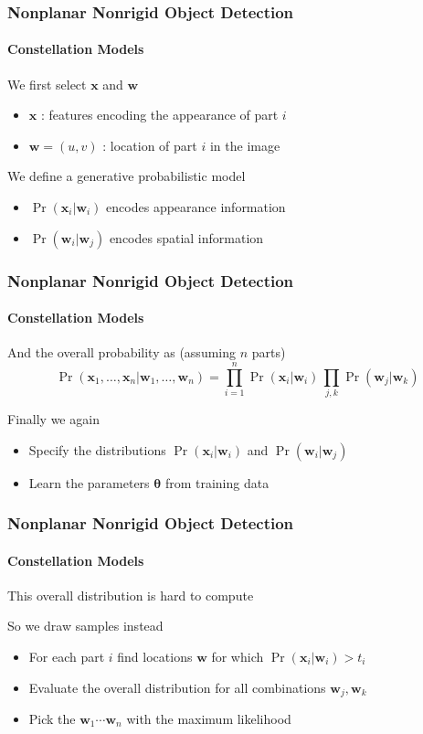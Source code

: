 \documentclass[xetex,professionalfont]{beamer}
\renewcommand{\vec}[1]{\ensuremath{\mathbf{#1}}}
\newcommand{\vw}{\vec{w}}
\newcommand{\vx}{\vec{x}}
\newcommand{\bth}{\boldsymbol{\theta}}
\begin{document}

\begin{frame}
\frametitle{Nonplanar Nonrigid Object Detection}
\framesubtitle{Constellation Models}

We first select $\vx$ and $\vw$
\begin{itemize}
    \item $\vx$ : features encoding the appearance of part $i$ %
    \item $\vw=(u,v)$ : location of part $i$ in the image
\end{itemize}

\bigskip
We define a generative probabilistic model
\begin{itemize}
    \item $\Pr(\vx_i|\vw_i)$ encodes appearance information
    \item $\Pr(\vw_i|\vw_j)$ encodes spatial information
\end{itemize}


\end{frame}


\begin{frame}
\frametitle{Nonplanar Nonrigid Object Detection}
\framesubtitle{Constellation Models}

And the overall probability as (assuming $n$ parts)
\[
    \Pr(\vx_1,\dots,\vx_n|\vw_1,\dots,\vw_n) = \prod_{i=1}^n \Pr(\vx_i|\vw_i)\, \prod_{j,k}\Pr(\vw_j|\vw_k)
\]

Finally we again
\begin{itemize}
    \item Specify the distributions $\Pr(\vx_i|\vw_i)$ and $\Pr(\vw_i|\vw_j)$ %
    \item Learn the parameters $\bth$ from training data %
\end{itemize}

\end{frame}


\begin{frame}
\frametitle{Nonplanar Nonrigid Object Detection}
\framesubtitle{Constellation Models}

This overall distribution is hard to compute

\bigskip
So we draw samples instead
\begin{itemize}
    \item For each part $i$ find locations $\vw$ for which $\Pr(\vx_i|\vw_i)>t_i$
    \item Evaluate the overall distribution for all combinations $\vw_j,\vw_k$
    \item Pick the $\vw_1\cdots\vw_n$ with the maximum likelihood %
\end{itemize}

\end{frame}
\end{document}
